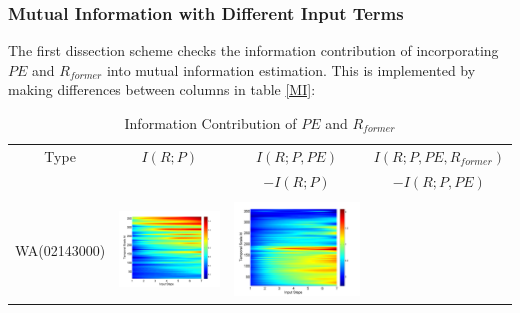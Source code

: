 \documentclass[draft,wrr]{AGUTeX}
\begin{document}
\begin{article}
\subsubsection{Mutual Information with Different Input Terms}
The first dissection scheme checks the information contribution of incorporating $PE$ and $R_{former}$ into mutual information estimation. This is implemented by making differences between columns in table \ref{MI}:
\begin{table}[H]\small
\caption{Information Contribution of $PE$ and $R_{former}$}
\label{PER}
\centering
\begin{tabular}{cccc}
\hline
Type&$I(R;P)$&$I(R;P,PE) $&$I(R;P,PE,R_{former}) $\\
 & &$ -I(R;P)$&$ -I(R;P,PE)$\\\hline
\\
WA(02143000)
&\begin{minipage}{.3\textwidth}\includegraphics[width=\linewidth]{resultgraph/02143000p.png}\end{minipage}
&\begin{minipage}{.3\textwidth}\includegraphics[width=\linewidth]{resultgraph/02143000diff_ep.png}\end{minipage}

\end{tabular}
\end{table}
\end{article}
\end{document}
